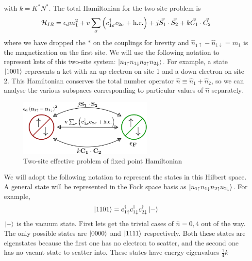 \documentclass[12pt,twoside]{report}
\numberwithin{equation}{section}
\begin{document}
with \(k = K^* N^*\). The total Hamiltonian for the two-site problem is
\begin{equation}\begin{aligned}
	\mathcal{H}_{IR} = \epsilon_d m_1^2 + v\sum_{\sigma}\left(c^\dagger_{1\sigma}c_{2\sigma} + \text{h.c.} \right) + j\vec{S_1}\cdot\vec{S_2} + k \vec{C_1}\cdot\vec{C_2}
\end{aligned}\end{equation}
where we have dropped the \(*\) on the couplings for brevity and \(\hat n_{1 \uparrow} - \hat n_{1 \downarrow}=m_1\) is the magnetization on the first site. We will use the following notation to represent kets of this two-site system: \(\ket{n_{1 \uparrow}n_{1 \downarrow}n_{2 \uparrow}n_{2 \downarrow}}\). For example, a state \(\ket{1001}\) represents a ket with an up electron on site 1 and a down electron on site 2. This Hamiltonian conserves the total number operator \(\hat n \equiv \hat n_1 + \hat n_2\), so we can analyse the various subspaces corresponding to particular values of \(\hat n\) separately.
\begin{figure}[htpb]
	\centering
	\includegraphics[width=0.6\textwidth]{../figures/two_site_problem.png}
	\caption{Two-site effective problem of fixed point Hamiltonian}
	\label{twosite}

\end{figure}
\pb We will adopt the following notation to represent the states in this Hilbert space. A general state will be represented in the Fock space basis as \(\ket{n_{1 \uparrow}n_{1 \downarrow}n_{2 \uparrow}n_{2 \downarrow}}\). For example,
\begin{equation}\begin{aligned}
	\ket{1101} = c^\dagger_{1 \uparrow}c^\dagger_{1 \downarrow}c^\dagger_{2 \downarrow}\ket{-}
\end{aligned}\end{equation}
\(\ket{-}\) is the vacuum state.
\pb First lets get the trivial cases of \(\hat n = 0, 4\) out of the way. The only possible states are \(\ket{0000}\) and \(\ket{1111}\) respectively. Both these states are eigenstates because the first one has no electron to scatter, and the second one has no vacant state to scatter into. These states have energy eigenvalues \( \frac{1}{4}k\)
\end{document}
